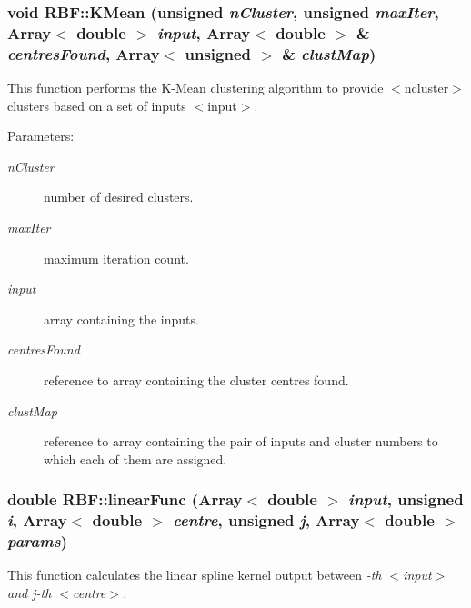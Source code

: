 \subsubsection{\setlength{\rightskip}{0pt plus 5cm}void RBF::KMean (unsigned {\em n\-Cluster}, unsigned {\em max\-Iter}, Array$<$ double $>$ {\em input}, Array$<$ double $>$ \& {\em centres\-Found}, Array$<$ unsigned $>$ \& {\em clust\-Map})\hspace{0.3cm}{\tt  [static]}}\label{classRBF_e16}


This function performs the K-Mean clustering algorithm to provide $<$ncluster$>$ clusters based on a set of inputs $<$input$>$. 

\begin{Desc}
\item[Parameters:]
\begin{description}
\item[{\em n\-Cluster}]number of desired clusters. \item[{\em max\-Iter}]maximum iteration count. \item[{\em input}]array containing the inputs. \item[{\em centres\-Found}]reference to array containing the cluster centres found. \item[{\em clust\-Map}]reference to array containing the pair of inputs and cluster numbers to which each of them are assigned.\end{description}
\end{Desc}
\subsubsection{\setlength{\rightskip}{0pt plus 5cm}double RBF::linear\-Func (Array$<$ double $>$ {\em input}, unsigned {\em i}, Array$<$ double $>$ {\em centre}, unsigned {\em j}, Array$<$ double $>$ {\em params})\hspace{0.3cm}{\tt  [static]}}\label{classRBF_e3}


This function calculates the linear spline kernel output between {\em -th $<$input$>$ and j-th $<$centre$>$. \/}

